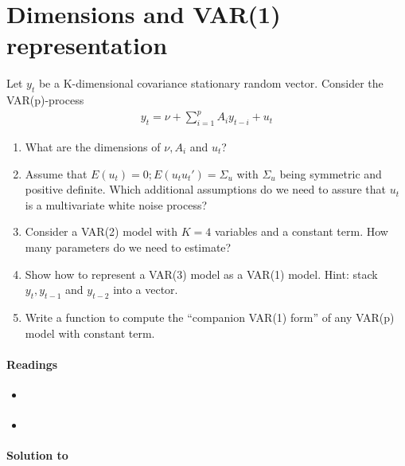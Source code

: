 \section[Dimensions and VAR{(1)} representation]{Dimensions and VAR{(1)} representation\label{ex:DimensionsAndVAROneRepresentation}}
Let \(y_t\) be a K-dimensional covariance stationary random vector.
Consider the VAR{(p)}-process
\begin{align*}
y_t = \nu + \sum_{i=1}^p A_i {y_{t-i}} + u_t
\end{align*}
\begin{enumerate}
\item What are the dimensions of \(\nu, A_i\) and \(u_{t}\)?

\item Assume that \(E(u_t) = 0; E(u_t u_t') = \Sigma_u\) with \(\Sigma_u\) being symmetric and positive definite.
Which additional assumptions do we need to assure that \(u_t\) is a multivariate white noise process?	

\item Consider a VAR{(2)} model with \(K=4\) variables and a constant term.
How many parameters do we need to estimate?

\item Show how to represent a VAR{(3)} model as a VAR{(1)} model.
Hint: stack \(y_t, y_{t-1}\) and \(y_{t-2}\) into a vector.

\item Write a function to compute the \enquote{companion VAR{(1)} form} of any VAR{(p)} model with constant term.
\end{enumerate}

\paragraph{Readings}
\begin{itemize}
\item \textcite[Ch.~2.2]{Kilian.Lutkepohl_2017_StructuralVectorAutoregressive}
\item \textcite[Ch.~2]{Lutkepohl_2005_NewIntroductionMultiple}
\end{itemize}

\begin{solution}\textbf{Solution to }
\ifDisplaySolutions%

\fi
\newpage
\end{solution}